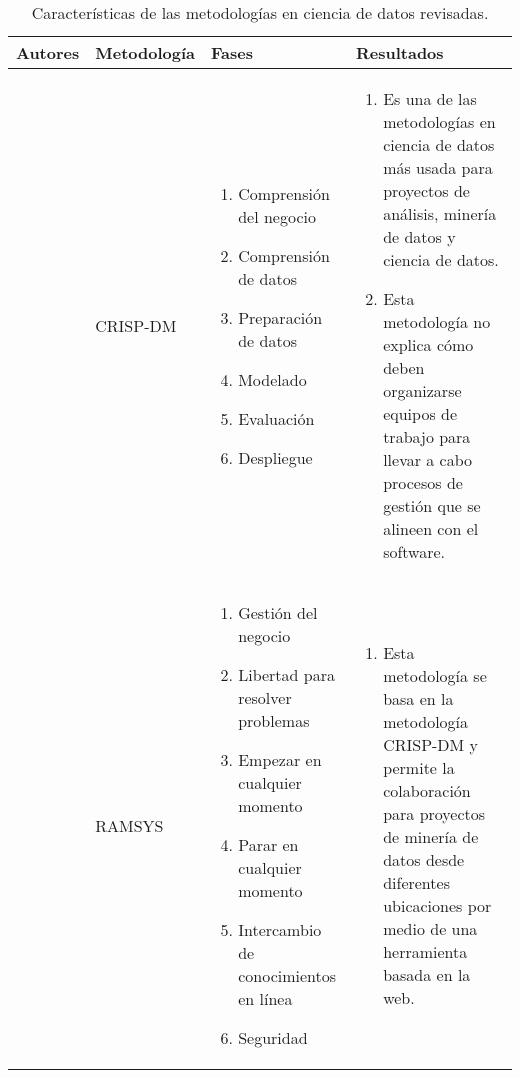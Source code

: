 \begin{table*}
	\begin{threeparttable}
		\caption{Características de las metodologías en ciencia de datos revisadas.}
		\label{metodologias}
		\begin{tabular}{ p{2cm} p{4cm} p{5cm} p{6cm}  } \toprule
			Autores 
			&Metodología           
			&Fases      
			&Resultados
			\\ \hline	
			\citep{Schroer2021}
			&CRISP-DM
			& \begin{enumerate}
				\item Comprensión del negocio
				\item Comprensión de datos
				\item Preparación de datos
				\item Modelado
				\item Evaluación
				\item Despliegue 
			\end{enumerate}
			& \begin{enumerate}
				\item Es una de las metodologías en ciencia de datos más usada para proyectos de análisis, minería de datos y ciencia de datos.
				\item Esta metodología no explica cómo deben organizarse equipos de trabajo para llevar a cabo procesos de gestión que se alineen con el software.
			\end{enumerate}
			\\ \hline
			\citep{Mladenic2012}
			&RAMSYS
			& \begin{enumerate}
			\item Gestión del negocio
			\item Libertad para resolver problemas
			\item Empezar en cualquier momento
			\item Parar en cualquier momento
			\item Intercambio de conocimientos en línea 
			\item Seguridad
			\end{enumerate}
			& \begin{enumerate}
				\item Esta metodología se basa en la metodología CRISP-DM y permite la colaboración para proyectos de minería de datos desde diferentes ubicaciones por medio de una herramienta basada en la web.

\end{enumerate}
\end{tabular}
\end{threeparttable}
\end{table*}
